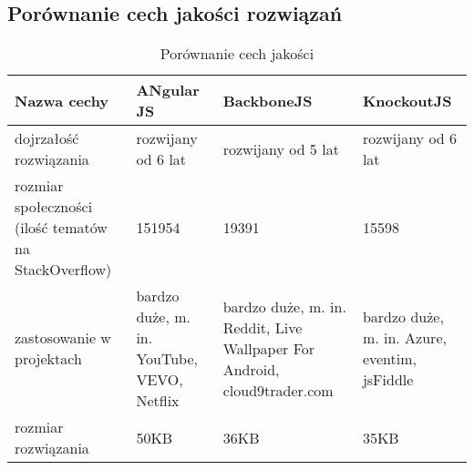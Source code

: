 \subsection{Porównanie cech jakości rozwiązań}
\begin{table}[h]
	\caption{Porównanie cech jakości}
	\label{tab:heading-styles}
	\begin{tabularx}{\textwidth}{|X|X|X|X|}
		\hline
		Nazwa cechy						& ANgular JS 	&  BackboneJS & KnockoutJS	\\ 
		\hline
		dojrzałość rozwiązania 		& rozwijany od 6 lat & rozwijany od 5 lat & rozwijany od 6 lat 	\\  
		\hline
		rozmiar społeczności (ilość tematów na StackOverflow)				& 151954 & 19391 & 15598 \\ 
		\hline
		zastosowanie w projektach			& bardzo duże, m. in. YouTube, VEVO, Netflix & bardzo duże, m. in. Reddit, Live Wallpaper For Android, cloud9trader.com  & bardzo duże, m. in. Azure, eventim, jsFiddle \\ 
		\hline
		rozmiar rozwiązania					& 50KB  & 36KB & 35KB\\
		\hline
	\end{tabularx}
\end{table}
